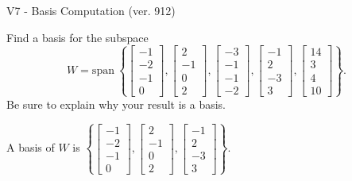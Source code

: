 \begin{exercise}
  \begin{exerciseTitle}V7 - Basis Computation (ver. 912)\end{exerciseTitle}
  \begin{exerciseStatement}
    Find a basis for the subspace 
\[W=\mathrm{span}\ \left\{\left[\begin{array}{r}
-1 \\
-2 \\
-1 \\
0
\end{array}\right] , \left[\begin{array}{r}
2 \\
-1 \\
0 \\
2
\end{array}\right] , \left[\begin{array}{r}
-3 \\
-1 \\
-1 \\
-2
\end{array}\right] , \left[\begin{array}{r}
-1 \\
2 \\
-3 \\
3
\end{array}\right] , \left[\begin{array}{r}
14 \\
3 \\
4 \\
10
\end{array}\right]\right\}.\]
 Be sure to explain why your result is a basis.


  \end{exerciseStatement}
  \begin{exerciseAnswer}
   A basis of \(W\) is  \(\left\{\left[\begin{array}{r}
-1 \\
-2 \\
-1 \\
0
\end{array}\right] , \left[\begin{array}{r}
2 \\
-1 \\
0 \\
2
\end{array}\right] , \left[\begin{array}{r}
-1 \\
2 \\
-3 \\
3
\end{array}\right]\right\}\).
  


  \end{exerciseAnswer}
\end{exercise}